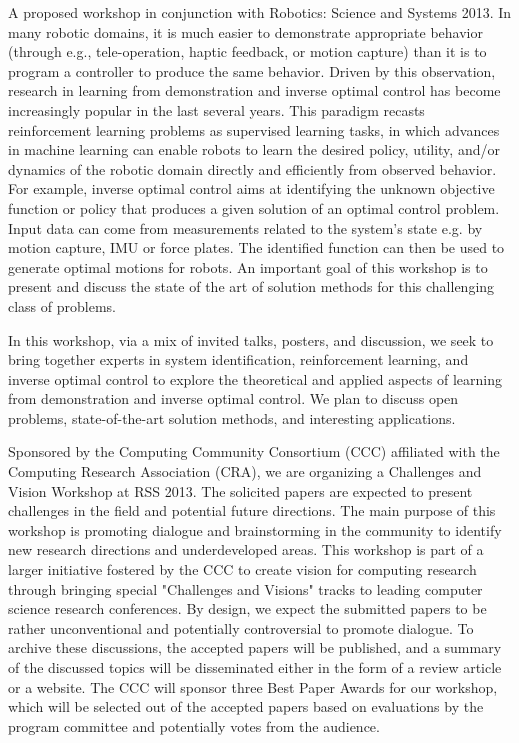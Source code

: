 \begin{spacing}{1.0}
{
A proposed workshop in conjunction with Robotics: Science and Systems 2013. In many robotic domains, it is much easier to demonstrate appropriate behavior (through e.g., tele-operation, haptic feedback, or motion capture) than it is to program a controller to produce the same behavior. Driven by this observation, research in learning from demonstration and inverse optimal control has become increasingly popular in the last several years. This paradigm recasts reinforcement learning problems as supervised learning tasks, in which advances in machine learning can enable robots to learn the desired policy, utility, and/or dynamics of the robotic domain directly and efficiently from observed behavior. For example, inverse optimal control aims at identifying the unknown objective function or policy that produces a given solution of an optimal control problem. Input data can come from measurements related to the system’s state e.g. by motion capture, IMU or force plates. The identified function can then be used to 
generate optimal motions for robots. An important goal of this workshop is to present and discuss the state of the art of solution methods for this challenging class of problems. 

In this workshop, via a mix of invited talks, posters, and discussion, we seek to bring together experts in system identification, reinforcement learning, and inverse optimal control to explore the theoretical and applied aspects of learning from demonstration and inverse optimal control. We plan to discuss open problems, state-of-the-art solution methods, and interesting applications. 
}

{
Sponsored by the Computing Community Consortium (CCC) affiliated with the Computing Research Association (CRA), we are organizing a Challenges and Vision Workshop at RSS 2013. The solicited papers are expected to present challenges in the field and potential future directions. The main purpose of this workshop is promoting dialogue and brainstorming in the community to identify new research directions and underdeveloped areas. This workshop is part of a larger initiative fostered by the CCC to create vision for computing research through bringing special "Challenges and Visions" tracks to leading computer science research conferences. By design, we expect the submitted papers to be rather unconventional and potentially controversial to promote dialogue. To archive these discussions, the accepted papers will be published, and a summary of the discussed topics will be disseminated either in the form of a review article or a website. The CCC will sponsor three Best Paper Awards for our workshop, which will be 
selected out of the accepted papers based on evaluations by the program committee and potentially votes from the audience.
}




\end{spacing}
